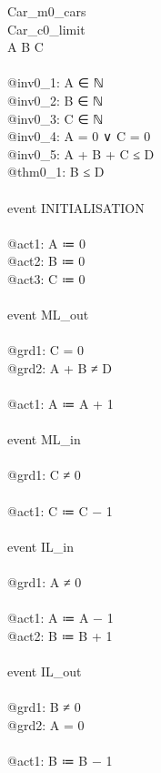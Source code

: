 \begin{description}
	\begin{center}
		\begin{Bcode}
			\ifplastex
			\Bmachine{} Car\_m0_cars\\
			\Bsees{} Car\_c0_limit\\
			\Bvariables{} A B C\\
			\Binvariants\\
			@inv0_1: A ∈ ℕ\\
			@inv0_2: B ∈ ℕ\\
			@inv0_3: C ∈ ℕ\\
			@inv0_4: A = 0 ∨ C = 0\\
			@inv0_5: A + B + C ≤ D\\
                        \Btheorem{} @thm0_1: B ≤ D\\
			\Bevents\\
			event INITIALISATION\\
			\Bthen\\
			@act1: A ≔ 0\\
			@act2: B ≔ 0\\
			@act3: C ≔ 0\\
			\Bend\\
			event ML_out\\
			\Bwhere\\
			@grd1: C = 0\\
			@grd2: A + B ≠ D\\
			\Bthen\\
			@act1: A ≔ A + 1\\
			\Bend\\
			event ML_in\\
			\Bwhere\\
			@grd1: C ≠ 0\\
			\Bthen\\
			@act1: C ≔ C − 1\\
			\Bend\\
			event IL_in\\
			\Bwhere\\
			@grd1: A ≠ 0\\
			\Bthen\\
			@act1: A ≔ A − 1\\
			@act2: B ≔ B + 1\\
			\Bend\\
			event IL_out\\
			\Bwhere\\
			@grd1: B ≠ 0\\
			@grd2: A = 0\\
			\Bthen\\
			@act1: B ≔ B − 1\\

\end{Bcode}
\end{center}
\end{description}
